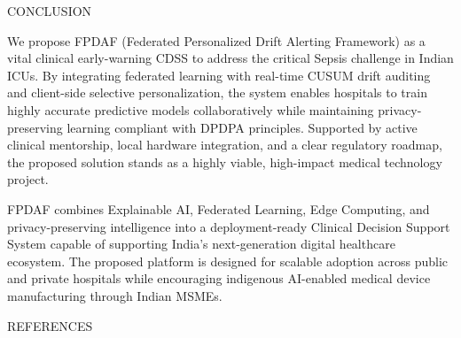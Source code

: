 \documentclass[11pt, a4paper]{article}
\begin{document}
\vspace{0.6cm}

{\Large\color{sectionBlue} CONCLUSION}
\vspace{0.2cm}

We propose FPDAF (Federated Personalized Drift Alerting Framework) as a vital clinical early-warning CDSS to address the critical Sepsis challenge in Indian ICUs. By integrating federated learning with real-time CUSUM drift auditing and client-side selective personalization, the system enables hospitals to train highly accurate predictive models collaboratively while maintaining privacy-preserving learning compliant with DPDPA principles. Supported by active clinical mentorship, local hardware integration, and a clear regulatory roadmap, the proposed solution stands as a highly viable, high-impact medical technology project.

\vspace{0.2cm}
FPDAF combines Explainable AI, Federated Learning, Edge Computing, and privacy-preserving intelligence into a deployment-ready Clinical Decision Support System capable of supporting India's next-generation digital healthcare ecosystem. The proposed platform is designed for scalable adoption across public and private hospitals while encouraging indigenous AI-enabled medical device manufacturing through Indian MSMEs.

\vspace{0.6cm}

{\Large\color{sectionBlue} REFERENCES}
\vspace{0.2cm}
\end{document}
